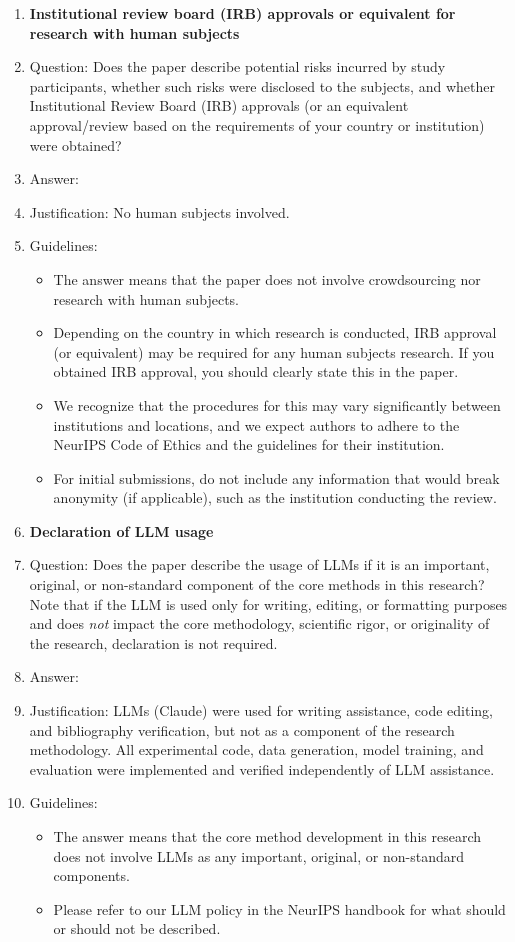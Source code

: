 \documentclass{article}
\begin{document}
\begin{enumerate}
\item {\bf Institutional review board (IRB) approvals or equivalent for research with human subjects}
    \item[] Question: Does the paper describe potential risks incurred by study participants, whether such risks were disclosed to the subjects, and whether Institutional Review Board (IRB) approvals (or an equivalent approval/review based on the requirements of your country or institution) were obtained?
    \item[] Answer: \answerNA{}
    \item[] Justification: No human subjects involved.
    \item[] Guidelines:
    \begin{itemize}
        \item The answer \answerNA{} means that the paper does not involve crowdsourcing nor research with human subjects.
        \item Depending on the country in which research is conducted, IRB approval (or equivalent) may be required for any human subjects research. If you obtained IRB approval, you should clearly state this in the paper.
        \item We recognize that the procedures for this may vary significantly between institutions and locations, and we expect authors to adhere to the NeurIPS Code of Ethics and the guidelines for their institution.
        \item For initial submissions, do not include any information that would break anonymity (if applicable), such as the institution conducting the review.
    \end{itemize}

\item {\bf Declaration of LLM usage}
    \item[] Question: Does the paper describe the usage of LLMs if it is an important, original, or non-standard component of the core methods in this research? Note that if the LLM is used only for writing, editing, or formatting purposes and does \emph{not} impact the core methodology, scientific rigor, or originality of the research, declaration is not required.
    \item[] Answer: \answerNA{}
    \item[] Justification: LLMs (Claude) were used for writing assistance, code editing, and bibliography verification, but not as a component of the research methodology. All experimental code, data generation, model training, and evaluation were implemented and verified independently of LLM assistance.
    \item[] Guidelines:
    \begin{itemize}
        \item The answer \answerNA{} means that the core method development in this research does not involve LLMs as any important, original, or non-standard components.
        \item Please refer to our LLM policy in the NeurIPS handbook for what should or should not be described.
    \end{itemize}

\end{enumerate}
\end{document}
